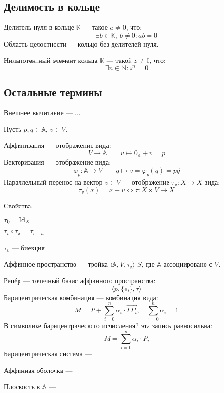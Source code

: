 \subsection{Делимость в кольце}

{\bold Делитель нуля} в кольце $\mathbb{K}$ --- такое $a\neq 0$, что:
$$\exists b\in\mathbb{K},\ b\neq 0\colon ab=0$$
{\bold Область целостности} --- кольцо без делителей нуля.

{\bold Нильпотентный элемент} кольца $\mathbb{K}$ --- такой $z\neq 0$, что:
$$\exists n\in\mathbb{N}\colon z^n=0$$

\subsection{Остальные термины}

{\bold Внешнее вычитание} --- ...

Пусть $p,q\in\mathbb{A}$, $v\in V$.

{\bold Аффинизация} --- отображение вида:
$$V\to\mathbb{A}\qquad v\mapsto 0_{\mathbb{A}}+v=p$$
{\bold Векторизация} --- отображение вида:
$$\varphi_p\colon\mathbb{A}\to V\qquad q\mapsto v=\varphi_p(q)=\overrightarrow{pq}$$
{\bold Параллельный перенос} на вектор $v\in V$ --- отображение $\tau_v\colon X\to X$ вида:
$$\tau_v(x)=x+v\iff \tau\colon X\times V\to X$$
\begin{theorem}
{\bold Свойства.}
\begin{list*}
\item $\tau_0=\mathrm{Id}_X$
\item $\tau_v\circ\tau_u=\tau_{v+u}$
\item $\tau_v$ --- биекция
\end{list*}
\end{theorem}
{\bold Аффинное пространство} --- тройка $\langle\mathbb{A},V,\tau_v\rangle$ $S$, где $\mathbb{A}$ ассоциировано с $V$.

{\bold Репéр} --- точечный базис аффинного пространства:
$$\langle p,\{e_i\},\tau\rangle$$
{\bold Барицентрическая комбинация} --- комбинация вида:
$$M=P+\sum_{i=0}^n\alpha_i\cdot\overrightarrow{PP_i},\quad\sum_{i=0}^n\alpha_i=1$$
В символике {\ital барицентрического исчисления?} эта запись равносильна:
$$M=\sum_{i=0}^n\alpha_i\cdot P_i$$
{\bold Барицентрическая система} ---

{\bold Аффинная оболочка} ---

{\bold Плоскость} в $\mathbb{A}$ ---

